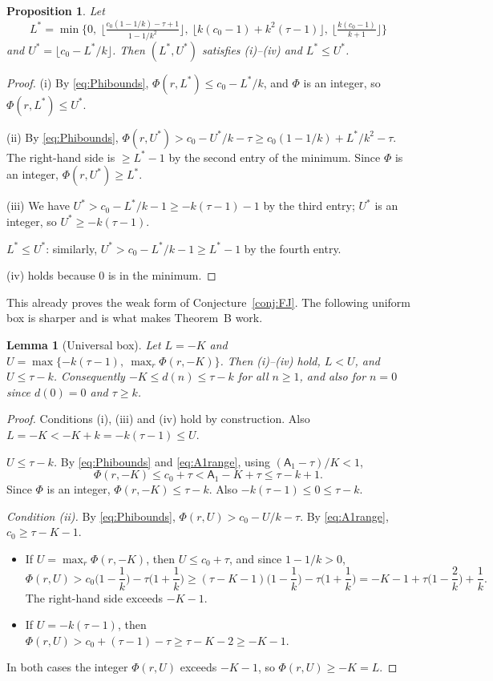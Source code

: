 \documentclass[11pt]{amsart}
\newtheorem{lemma}[theorem]{Lemma}
\newtheorem{proposition}[theorem]{Proposition}
\theoremstyle{definition}
\theoremstyle{remark}
\begin{document}
\begin{proposition}\label{prop:explicit}
Let
\[
L^*=\min\Big\{0,\ \Big\lfloor\tfrac{c_0(1-1/k)-\tau+1}{1-1/k^2}\Big\rfloor,\ \big\lfloor k(c_0-1)+k^2(\tau-1)\big\rfloor,\ \Big\lfloor\tfrac{k(c_0-1)}{k+1}\Big\rfloor\Big\}
\]
and $U^*=\lfloor c_0-L^*/k\rfloor$. Then $(L^*,U^*)$ satisfies (i)--(iv) and $L^*\le U^*$.
\end{proposition}

\begin{proof}
(i) By \eqref{eq:Phibounds}, $\Phi(r,L^*)\le c_0-L^*/k$, and $\Phi$ is an integer, so $\Phi(r,L^*)\le U^*$.

(ii) By \eqref{eq:Phibounds}, $\Phi(r,U^*)>c_0-U^*/k-\tau\ge c_0(1-1/k)+L^*/k^2-\tau$. The right-hand side is $\ge L^*-1$ by the second entry of the minimum. Since $\Phi$ is an integer, $\Phi(r,U^*)\ge L^*$.

(iii) We have $U^*>c_0-L^*/k-1\ge-k(\tau-1)-1$ by the third entry; $U^*$ is an integer, so $U^*\ge-k(\tau-1)$.

$L^*\le U^*$: similarly, $U^*>c_0-L^*/k-1\ge L^*-1$ by the fourth entry.

(iv) holds because $0$ is in the minimum.
\end{proof}

This already proves the weak form of Conjecture~\ref{conj:FJ}. The following uniform box is sharper and is what makes Theorem~B work.

\begin{lemma}[Universal box]\label{lem:universal}
Let $L=-K$ and $U=\max\{-k(\tau-1),\ \max_r\Phi(r,-K)\}$. Then (i)--(iv) hold, $L<U$, and $U\le\tau-k$. Consequently $-K\le d(n)\le\tau-k$ for all $n\ge1$, and also for $n=0$ since $d(0)=0$ and $\tau\ge k$.
\end{lemma}

\begin{proof}
Conditions (i), (iii) and (iv) hold by construction. Also $L=-K<-K+k=-k(\tau-1)\le U$.

\emph{$U\le\tau-k$.} By \eqref{eq:Phibounds} and \eqref{eq:A1range}, using $(\mathsf A_1-\tau)/K<1$,
\[
\Phi(r,-K)\le c_0+\tau<\mathsf A_1-K+\tau\le\tau-k+1 .
\]
Since $\Phi$ is an integer, $\Phi(r,-K)\le\tau-k$. Also $-k(\tau-1)\le0\le\tau-k$.

\emph{Condition (ii).} By \eqref{eq:Phibounds}, $\Phi(r,U)>c_0-U/k-\tau$. By \eqref{eq:A1range}, $c_0\ge\tau-K-1$.
\begin{itemize}
\item If $U=\max_r\Phi(r,-K)$, then $U\le c_0+\tau$, and since $1-1/k>0$,
\[
\Phi(r,U)>c_0\Big(1-\frac1k\Big)-\tau\Big(1+\frac1k\Big)\ge(\tau-K-1)\Big(1-\frac1k\Big)-\tau\Big(1+\frac1k\Big)=-K-1+\tau\Big(1-\frac2k\Big)+\frac1k .
\]
The right-hand side exceeds $-K-1$.
\item If $U=-k(\tau-1)$, then $\Phi(r,U)>c_0+(\tau-1)-\tau\ge\tau-K-2\ge-K-1$.
\end{itemize}
In both cases the integer $\Phi(r,U)$ exceeds $-K-1$, so $\Phi(r,U)\ge-K=L$.
\end{proof}
\end{document}
